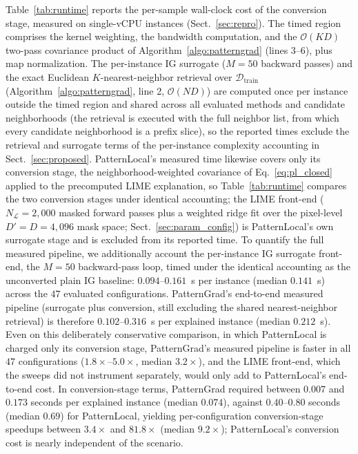 \documentclass[pdflatex,sn-mathphys-num]{sn-jnl}
\theoremstyle{thmstyleone}
\theoremstyle{thmstyletwo}%
\theoremstyle{thmstylethree}%
\begin{document}
Table~\ref{tab:runtime} reports the per-sample wall-clock cost of the conversion stage, measured on single-vCPU instances (Sect.~\ref{sec:repro}). The timed region comprises the kernel weighting, the bandwidth computation, and the $\mathcal{O}(KD)$ two-pass covariance product of Algorithm~\ref{algo:patterngrad} (lines 3--6), plus map normalization. The per-instance IG surrogate ($M = 50$ backward passes) and the exact Euclidean $K$-nearest-neighbor retrieval over $\mathcal{D}_{\text{train}}$ (Algorithm~\ref{algo:patterngrad}, line 2, $\mathcal{O}(ND)$) are computed once per instance outside the timed region and shared across all evaluated methods and candidate neighborhoods (the retrieval is executed with the full neighbor list, from which every candidate neighborhood is a prefix slice), so the reported times exclude the retrieval and surrogate terms of the per-instance complexity accounting in Sect.~\ref{sec:proposed}. PatternLocal's measured time likewise covers only its conversion stage, the neighborhood-weighted covariance of Eq.~\eqref{eq:pl_closed} applied to the precomputed LIME explanation, so Table~\ref{tab:runtime} compares the two conversion stages under identical accounting; the LIME front-end ($N_{\mathcal{L}} = 2{,}000$ masked forward passes plus a weighted ridge fit over the pixel-level $D' = D = 4{,}096$ mask space; Sect.~\ref{sec:param_config}) is PatternLocal's own surrogate stage and is excluded from its reported time. To quantify the full measured pipeline, we additionally account the per-instance IG surrogate front-end, the $M = 50$ backward-pass loop, timed under the identical accounting as the unconverted plain IG baseline: $0.094$--$0.161$~s per instance (median $0.141$~s) across the $47$ evaluated configurations. PatternGrad's end-to-end measured pipeline (surrogate plus conversion, still excluding the shared nearest-neighbor retrieval) is therefore $0.102$--$0.316$~s per explained instance (median $0.212$~s). Even on this deliberately conservative comparison, in which PatternLocal is charged only its conversion stage, PatternGrad's measured pipeline is faster in all $47$ configurations ($1.8\times$--$5.0\times$, median $3.2\times$), and the LIME front-end, which the sweeps did not instrument separately, would only add to PatternLocal's end-to-end cost. In conversion-stage terms, PatternGrad required between $0.007$ and $0.173$ seconds per explained instance (median $0.074$), against $0.40$--$0.80$ seconds (median $0.69$) for PatternLocal, yielding per-configuration conversion-stage speedups between $3.4\times$ and $81.8\times$ (median $9.2\times$); PatternLocal's conversion cost is nearly independent of the scenario.
\end{document}
